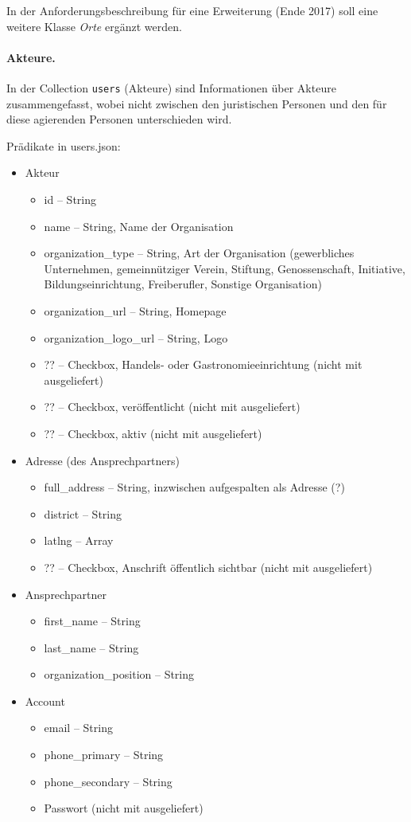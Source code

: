 \documentclass[a4paper,11pt]{article}
\begin{document}
In der Anforderungsbeschreibung für eine Erweiterung (Ende 2017) soll eine
weitere Klasse \emph{Orte} ergänzt werden.  

\paragraph{Akteure.}
In der Collection \texttt{users} (Akteure) sind Informationen über Akteure
zusammengefasst, wobei nicht zwischen den juristischen Personen und den für
diese agierenden Personen unterschieden wird. 

Prädikate in users.json:
\begin{itemize}\itemsep0pt
\item Akteur
\begin{itemize}\itemsep0pt
  \item id -- String
  \item name -- String, Name der Organisation
  \item organization\_type -- String, Art der Organisation (gewerbliches
    Unternehmen, gemeinnütziger Verein, Stiftung, Genossenschaft, Initiative,
    Bildungseinrichtung, Freiberufler, Sonstige Organisation)
  \item organization\_url -- String, Homepage
  \item organization\_logo\_url -- String, Logo
  \item ?? -- Checkbox, Handels- oder Gastronomieeinrichtung (nicht mit
    ausgeliefert)
  \item ?? -- Checkbox, veröffentlicht (nicht mit ausgeliefert)
  \item ?? -- Checkbox, aktiv (nicht mit ausgeliefert)
\end{itemize}
\item Adresse (des Ansprechpartners)
\begin{itemize}\itemsep0pt
  \item full\_address -- String, inzwischen aufgespalten als Adresse (?)
  \item district -- String
  \item latlng -- Array
\item ?? -- Checkbox, Anschrift öffentlich sichtbar (nicht mit ausgeliefert)
\end{itemize}
\item Ansprechpartner
\begin{itemize}\itemsep0pt
  \item first\_name -- String
  \item last\_name -- String
  \item organization\_position -- String
\end{itemize}
\item Account
\begin{itemize}\itemsep0pt
  \item email -- String
  \item phone\_primary -- String
  \item phone\_secondary -- String
  \item Passwort (nicht mit ausgeliefert)
\end{itemize}
\end{itemize}
\end{document}
